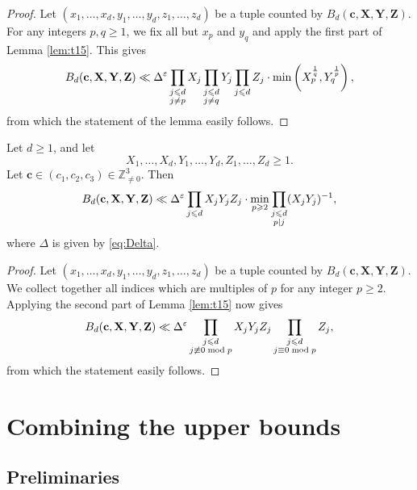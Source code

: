\begin{proof}
Let $(x_1,\ldots, x_d,y_1,\ldots, y_d,z_1,\ldots, z_d)$ be a tuple counted by $B_d(\mathbf{c},\mathbf{X},\mathbf{Y},\mathbf{Z})$.
For any integers $p,q\geq 1$, we fix all but $x_p$ and $y_q$ and apply
the first part of  Lemma \ref{lem:t15}. This gives
$$
B_d(\mathbf{c},\mathbf{X},\mathbf{Y},\mathbf{Z})  \ll
\Delta^\varepsilon \prod_{\substack{j\leqslant d\\ j\neq p }} X_j
\prod_{\substack{j\leqslant d\\ j\neq q }} Y_j
\prod_{\substack{j\leqslant d }} Z_j \cdot
\min\left( X_p^{\frac{1}{q}} , Y_q^{\frac{1}{p}}\right) ,
$$
from which the  statement of the lemma easily follows.
\end{proof}





\begin{proposition} \label{prop:thue}
Let $d\geq 1$, and let
$$
X_1,\ldots, X_d, Y_1,\ldots, Y_d,Z_1,\ldots, Z_d\geq 1.
$$
Let $\mathbf{c}\in (c_1,c_2,c_3)\in \mathbb{Z}_{\neq 0}^3$.
Then
$$
B_d(\mathbf{c},\mathbf{X},\mathbf{Y},\mathbf{Z})  \ll
\Delta^\varepsilon \prod_{j\leqslant d} X_jY_jZ_j \cdot
\min_{p\geqslant 2}
\prod_{\substack{j\leqslant d \\ p\mid j}} (X_jY_j)^{-1},
$$
where $\Delta$ is given by \eqref{eq:Delta}.
\end{proposition}


\begin{proof}
Let $(x_1,\ldots, x_d,y_1,\ldots, y_d,z_1,\ldots, z_d)$ be a tuple counted by $B_d(\mathbf{c},\mathbf{X},\mathbf{Y},\mathbf{Z})$.
We collect together all indices which are multiples of $p$ for any integer $p\geq 2$.
Applying the second part of  Lemma \ref{lem:t15} now gives
$$
B_d(\mathbf{c},\mathbf{X},\mathbf{Y},\mathbf{Z})  \ll
\Delta^\varepsilon \prod_{\substack{j\leqslant d\\ j\not\equiv 0 \bmod{p} }} X_jY_jZ_j
 \prod_{\substack{j\leqslant d\\ j\equiv 0 \bmod{p} }} Z_j,
$$
from which the statement easily follows.
\end{proof}



\chapter{Combining the upper bounds }

\section{Preliminaries}

